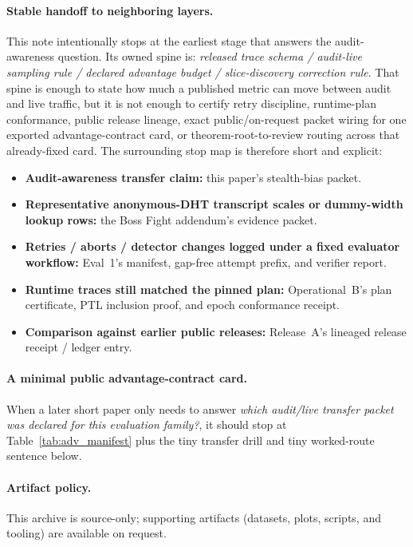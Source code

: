 \documentclass[11pt]{article}
\begin{document}
\paragraph{Stable handoff to neighboring layers.}
This note intentionally stops at the earliest stage that answers the audit-awareness question.
Its owned spine is:
\emph{released trace schema / audit-live sampling rule / declared advantage budget / slice-discovery correction rule}.
That spine is enough to state how much a published metric can move between audit and live traffic, but it is not enough to certify retry discipline, runtime-plan conformance, public release lineage, exact public/on-request packet wiring for one exported advantage-contract card, or theorem-root-to-review routing across that already-fixed card.
The surrounding stop map is therefore short and explicit:
\begin{itemize}[leftmargin=1.2em,itemsep=0.2em,topsep=0.35em]
\item \textbf{Audit-awareness transfer claim:} this paper's stealth-bias packet.
\item \textbf{Representative anonymous-DHT transcript scales or dummy-width lookup rows:} the Boss Fight addendum's evidence packet.\cite{series:bossfightBaddendum}
\item \textbf{Retries / aborts / detector changes logged under a fixed evaluator workflow:} Eval~1's manifest, gap-free attempt prefix, and verifier report.
\item \textbf{Runtime traces still matched the pinned plan:} Operational~B's plan certificate, PTL inclusion proof, and epoch conformance receipt.
\item \textbf{Comparison against earlier public releases:} Release~A's lineaged release receipt / ledger entry.
\end{itemize}
\paragraph{A minimal public advantage-contract card.}
When a later short paper only needs to answer \emph{which audit/live transfer packet was declared for this evaluation family?}, it should stop at Table~\ref{tab:adv_manifest} plus the tiny transfer drill and tiny worked-route sentence below.

\paragraph{Artifact policy.}
This archive is source-only; supporting artifacts (datasets, plots, scripts, and tooling) are available on request.\cite{series:artifactpolicy}
\end{document}
